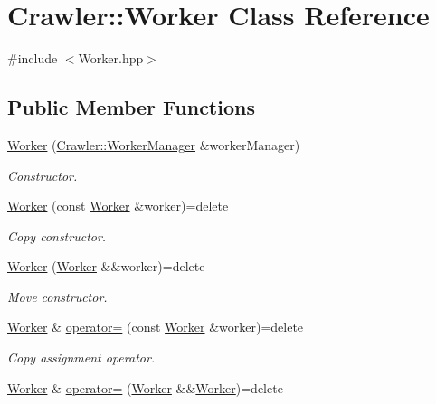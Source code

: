 \hypertarget{class_crawler_1_1_worker}{}\section{Crawler\+:\+:Worker Class Reference}
\label{class_crawler_1_1_worker}


{\ttfamily \#include $<$Worker.\+hpp$>$}

\subsection*{Public Member Functions}
\begin{DoxyCompactItemize}
\item 
\hyperlink{class_crawler_1_1_worker_aa104c31810cb5cf5511225b1dcf8e79e}{Worker} (\hyperlink{class_crawler_1_1_worker_manager}{Crawler\+::\+Worker\+Manager} \&worker\+Manager)
\begin{DoxyCompactList}\small\item\em Constructor. \end{DoxyCompactList}\item 
\hyperlink{class_crawler_1_1_worker_a2939d4da20ac77b780909ce7d6ec382b}{Worker} (const \hyperlink{class_crawler_1_1_worker}{Worker} \&worker)=delete
\begin{DoxyCompactList}\small\item\em Copy constructor. \end{DoxyCompactList}\item 
\hyperlink{class_crawler_1_1_worker_a971eeab5ffda801b6045e4fe79e9ff0e}{Worker} (\hyperlink{class_crawler_1_1_worker}{Worker} \&\&worker)=delete
\begin{DoxyCompactList}\small\item\em Move constructor. \end{DoxyCompactList}\item 
\hyperlink{class_crawler_1_1_worker}{Worker} \& \hyperlink{class_crawler_1_1_worker_ab0e0e7720897362f6cf040dea3a0f0ea}{operator=} (const \hyperlink{class_crawler_1_1_worker}{Worker} \&worker)=delete
\begin{DoxyCompactList}\small\item\em Copy assignment operator. \end{DoxyCompactList}\item 
\hyperlink{class_crawler_1_1_worker}{Worker} \& \hyperlink{class_crawler_1_1_worker_a3a53de929d2e4091555f775a6b62138b}{operator=} (\hyperlink{class_crawler_1_1_worker}{Worker} \&\&\hyperlink{class_crawler_1_1_worker}{Worker})=delete

\end{DoxyCompactItemize}
